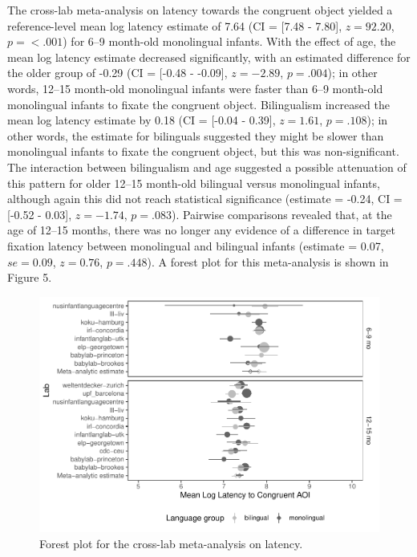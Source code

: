 \documentclass[english,,man,floatsintext]{apa6}
\begin{document}
The cross-lab meta-analysis on latency towards the congruent object yielded a reference-level mean log latency estimate of 7.64 (CI = {[}7.48 - 7.80{]}, \(z = 92.20\), \(p = < .001\)) for 6--9 month-old monolingual infants. With the effect of age, the mean log latency estimate decreased significantly, with an estimated difference for the older group of -0.29 (CI = {[}-0.48 - -0.09{]}, \(z = -2.89\), \(p = .004\)); in other words, 12--15 month-old monolingual infants were faster than 6--9 month-old monolingual infants to fixate the congruent object. Bilingualism increased the mean log latency estimate by 0.18 (CI = {[}-0.04 - 0.39{]}, \(z = 1.61\), \(p = .108\)); in other words, the estimate for bilinguals suggested they might be slower than monolingual infants to fixate the congruent object, but this was non-significant. The interaction between bilingualism and age suggested a possible attenuation of this pattern for older 12--15 month-old bilingual versus monolingual infants, although again this did not reach statistical significance (estimate = -0.24, CI = {[}-0.52 - 0.03{]}, \(z = -1.74\), \(p = .083\)). Pairwise comparisons revealed that, at the age of 12--15 months, there was no longer any evidence of a difference in target fixation latency between monolingual and bilingual infants (estimate = 0.07, \(se = 0.09\), \(z = 0.76\), \(p = .448\)). A forest plot for this meta-analysis is shown in Figure 5.

\begin{figure}
\centering
\includegraphics{gaze-following-paper_files/figure-latex/fig5-1.pdf}
\caption{\label{fig:fig5}Forest plot for the cross-lab meta-analysis on latency.}
\end{figure}
\end{document}
